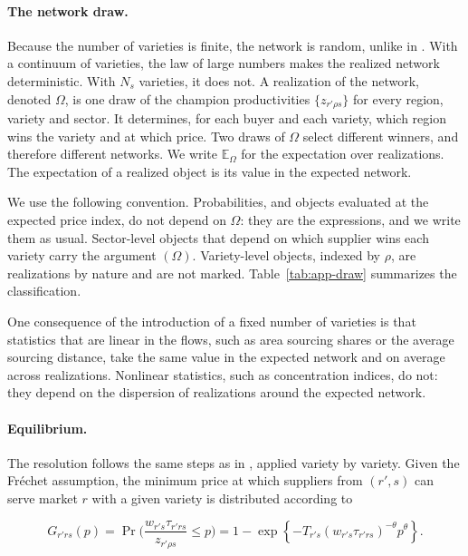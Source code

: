 \paragraph{The network draw.}\label{app:network-draw}

Because the number of varieties is finite, the network is random, unlike in \cite{EatonKortum2002}. With a continuum of varieties, the law of large numbers makes the realized network deterministic. With $N_{s}$ varieties, it does not. A realization of the network, denoted $\Omega$, is one draw of the champion productivities $\{z_{r'\rho s}\}$ for every region, variety and sector. It determines, for each buyer and each variety, which region wins the variety and at which price. Two draws of $\Omega$ select different winners, and therefore different networks. We write $\mathbb{E}_{\Omega}$ for the expectation over realizations. The expectation of a realized object is its value in the expected network.
 
We use the following convention. Probabilities, and objects evaluated at the expected price index, do not depend on $\Omega$: they are the \cite{EatonKortum2002} expressions, and we write them as usual. Sector-level objects that depend on which supplier wins each variety carry the argument $(\Omega)$. Variety-level objects, indexed by $\rho$, are realizations by nature and are not marked. Table~\ref{tab:app-draw} summarizes the classification. 

One consequence of the introduction of a fixed number of varieties is that statistics that are linear in the flows, such as area sourcing shares or the average sourcing distance, take the same value in the expected network and on average across realizations. Nonlinear statistics, such as concentration indices, do not: they depend on the dispersion of realizations around the expected network.


\paragraph{Equilibrium.}\label{app:equilibrium}
The resolution follows the same steps as in \cite{EatonKortum2002}, applied variety by variety. Given the Fréchet assumption, the minimum price at which suppliers from $(r',s)$ can serve market $r$ with a given variety is distributed according to
 
\begin{equation}
G_{r'rs}(p)=\Pr\Big(\frac{w_{r's}\tau_{r'rs}}{z_{r'\rho s}}\le p\Big)
=1-\exp\left\{-T_{r's}(w_{r's}\tau_{r'rs})^{-\theta}p^\theta\right\}.
\end{equation}
 
